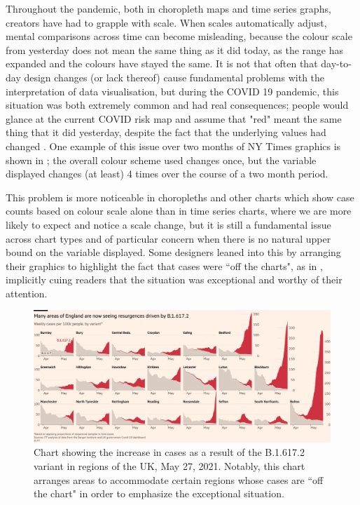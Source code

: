 \documentclass[article]{jdssv}\usepackage[]{graphicx}\usepackage[]{color}
\begin{document}
Throughout the pandemic, both in choropleth maps and time series graphs, creators have had to grapple with scale. When scales automatically adjust, mental comparisons across time can become misleading, because the colour scale from yesterday does not mean the same thing as it did today, as the range has expanded and the colours have stayed the same. 
It is not that often that day-to-day design changes (or lack thereof) cause fundamental problems with the interpretation of data visualisation, but during the COVID 19 pandemic, this situation was both extremely common and had real consequences; people would glance at the current COVID risk map and assume that "red" meant the same thing that it did yesterday, despite the fact that the underlying values had changed \citep{abiadColorDiagramWHOLebanon2020,rubelHeyUpshotNYTCurious2020,matthewsLessonFutzingData2020}. 
One example of this issue over two months of NY Times graphics is shown in ; the overall colour scheme used changes once, but the variable displayed changes (at least) 4 times over the course of a two month period. 


This problem is more noticeable in choropleths and other charts which show case counts based on colour scale alone than in time series charts, where we are more likely to expect and notice a scale change, but it is still a fundamental issue across chart types and of particular concern when there is no natural upper bound on the variable displayed. 
Some designers leaned into this by arranging their graphics to highlight the fact that cases were ``off the charts", as in , implicitly cuing readers that the situation was exceptional and worthy of their attention.

\begin{figure}
\includegraphics[width=.99\linewidth]{ft-off-charts}
\caption{Chart showing the increase in cases as a result of the B.1.617.2 variant in regions of the UK, May 27, 2021. Notably, this chart arranges areas to accommodate certain regions whose cases are ``off the chart" in order to emphasize the exceptional situation. \citep{burn-murdochNEW1617Fuelling2021}}
\label{fig:jbm-tweet}
\end{figure}
\end{document}
